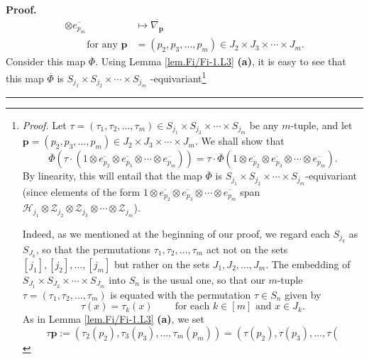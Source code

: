\documentclass[numbers=enddot,12pt,final,onecolumn,notitlepage]{scrartcl}%
\theoremstyle{definition}
\newenvironment{proof}[1][Proof]{\noindent\textbf{#1.} }{\ \rule{0.5em}{0.5em}}
\begin{document}
\begin{proof}
\begin{align*}
\otimes\overline{e_{p_{m}}}  &  \mapsto\overline{\nabla_{\mathbf{p}}}\\
\ \ \ \ \ \ \ \ \ \ \text{for any }\mathbf{p}  &  =\left(  p_{2},p_{3}%
,\ldots,p_{m}\right)  \in J_{2}\times J_{3}\times\cdots\times J_{m}.
\end{align*}
Consider this map $\overline{\Phi}$. Using Lemma \ref{lem.Fi/Fi-1.L3}
\textbf{(a)}, it is easy to see that this map $\overline{\Phi}$ is $S_{j_{1}%
}\times S_{j_{2}}\times\cdots\times S_{j_{m}}$%
-equivariant\footnote{\textit{Proof.} Let $\tau=\left(  \tau_{1},\tau
_{2},\ldots,\tau_{m}\right)  \in S_{j_{1}}\times S_{j_{2}}\times\cdots\times
S_{j_{m}}$ be any $m$-tuple, and let $\mathbf{p}=\left(  p_{2},p_{3}%
,\ldots,p_{m}\right)  \in J_{2}\times J_{3}\times\cdots\times J_{m}$. We shall
show that%
\[
\overline{\Phi}\left(  \tau\cdot\left(  1\otimes\overline{e_{p_{2}}}%
\otimes\overline{e_{p_{3}}}\otimes\cdots\otimes\overline{e_{p_{m}}}\right)
\right)  =\tau\cdot\overline{\Phi}\left(  1\otimes\overline{e_{p_{2}}}%
\otimes\overline{e_{p_{3}}}\otimes\cdots\otimes\overline{e_{p_{m}}}\right)  .
\]
By linearity, this will entail that the map $\overline{\Phi}$ is $S_{j_{1}%
}\times S_{j_{2}}\times\cdots\times S_{j_{m}}$-equivariant (since elements of
the form $1\otimes\overline{e_{p_{2}}}\otimes\overline{e_{p_{3}}}\otimes
\cdots\otimes\overline{e_{p_{m}}}$ span $\mathcal{H}_{j_{1}}\otimes
\mathcal{Z}_{j_{2}}\otimes\mathcal{Z}_{j_{3}}\otimes\cdots\otimes
\mathcal{Z}_{j_{m}}$).
\par
Indeed, as we mentioned at the beginning of our proof, we regard each
$S_{j_{k}}$ as $S_{J_{k}}$, so that the permutations $\tau_{1},\tau_{2}%
,\ldots,\tau_{m}$ act not on the sets $\left[  j_{1}\right]  ,\left[
j_{2}\right]  ,\ldots,\left[  j_{m}\right]  $ but rather on the sets
$J_{1},J_{2},\ldots,J_{m}$. The embedding of $S_{J_{1}}\times S_{J_{2}}%
\times\cdots\times S_{J_{m}}$ into $S_{n}$ is the usual one, so that our
$m$-tuple $\tau=\left(  \tau_{1},\tau_{2},\ldots,\tau_{m}\right)  $ is equated
with the permutation $\tau\in S_{n}$ given by%
\begin{equation}
\tau\left(  x\right)  =\tau_{k}\left(  x\right)  \ \ \ \ \ \ \ \ \ \ \text{for
each }k\in\left[  m\right]  \text{ and }x\in J_{k}.
\label{pf.thm.Fi/Fi-1.as-ind.fn.six=}%
\end{equation}
As in Lemma \ref{lem.Fi/Fi-1.L3} \textbf{(a)}, we set%
\[
\tau\mathbf{p}:=\left(  \tau_{2}\left(  p_{2}\right)  ,\tau_{3}\left(
p_{3}\right)  ,\ldots,\tau_{m}\left(  p_{m}\right)  \right)  =\left(
\tau\left(  p_{2}\right)  ,\tau\left(  p_{3}\right)  ,\ldots,\tau\left(
\]}
\end{proof}
\end{document}
